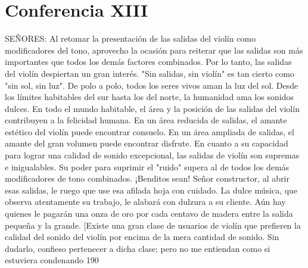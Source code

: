 \chapter*{Conferencia XIII}
SEÑORES: Al retomar la presentación de las salidas del violín como modificadores del tono, aprovecho la ocasión para reiterar que las salidas son más importantes que todos los demás factores combinados. Por lo tanto, las salidas del violín despiertan un gran interés. "Sin salidas, sin violín" es tan cierto como "sin sol, sin luz". De polo a polo, todos los seres vivos aman la luz del sol. Desde los límites habitables del sur hasta los del norte, la humanidad ama los sonidos dulces. En todo el mundo habitable, el área y la posición de las salidas del violín contribuyen a la felicidad humana. En un área reducida de salidas, el amante estético del violín puede encontrar consuelo. En un área ampliada de salidas, el amante del gran volumen puede encontrar disfrute.
En cuanto a su capacidad para lograr una calidad de sonido excepcional, las salidas de violín son supremas e inigualables. Su poder para suprimir el "ruido" supera al de todos los demás modificadores de tono combinados.
¡Benditos sean!
Señor constructor, al abrir esas salidas, le ruego que use esa afilada hoja con cuidado. La dulce música, que observa atentamente su trabajo, le alabará con dulzura a su cliente. Aún hay quienes le pagarán una onza de oro por cada centavo de madera entre la salida pequeña y la grande.
[Existe una gran clase de usuarios de violín que prefieren la calidad del sonido del violín por encima de la mera cantidad de sonido. Sin dudarlo, confieso pertenecer a dicha clase; pero no me entiendan como si estuviera condenando
190

